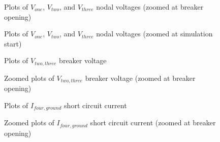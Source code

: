 \documentclass[10pt, oneside, letterpaper]{article}
\begin{document}
\begin{figure}[H]
    \begin{center}
        
    \end{center}
    \caption{Plots of $V_{one}$, $V_{two}$, and $V_{three}$ nodal voltages (zoomed at breaker opening)}
    \label{nodal_v_plots_zoom_1}
\end{figure}

\begin{figure}[H]
    \begin{center}
        
    \end{center}
    \caption{Plots of $V_{one}$, $V_{two}$, and $V_{three}$ nodal voltages (zoomed at simulation start)}
    \label{nodal_v_plots_zoom_2}
\end{figure}

\begin{figure}[H]
    \begin{center}
        
    \end{center}
    \caption{Plots of $V_{two, three}$ breaker voltage}
    \label{breaker_v_plots}
\end{figure}

\begin{figure}[H]
    \begin{center}
        
    \end{center}
    \caption{Zoomed plots of $V_{two, three}$ breaker voltage (zoomed at breaker opening)}
    \label{breaker_v_plots_zoom}
\end{figure}

\begin{figure}[H]
    \begin{center}
        
    \end{center}
    \caption{Plots of $I_{four, ground}$ short circuit current}
    \label{short_circuit_i_plots}
\end{figure}

\begin{figure}[H]
    \begin{center}
        
    \end{center}
    \caption{Zoomed plots of $I_{four, ground}$ short circuit current (zoomed at breaker opening)}
    \label{short_circuit_i_plots_zoom_1}
\end{figure}
\end{document}
